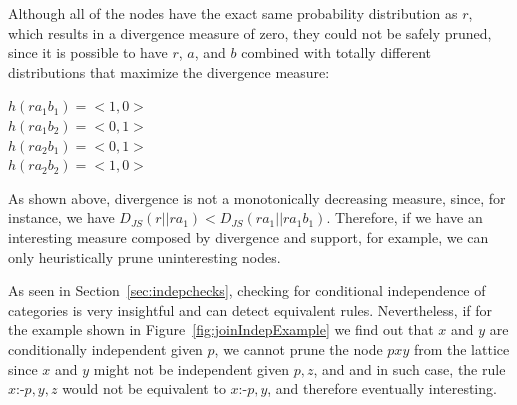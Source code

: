 Although all of the nodes have the exact same probability distribution as $r$, which results in a divergence measure of
zero, they could not be safely pruned, since it is possible to have $r$, $a$, and $b$ combined with totally different
distributions that maximize the divergence measure:

\begin{center}
$h(ra_1b_1)=<1,0>$ \\
$h(ra_1b_2)=<0,1>$ \\
$h(ra_2b_1)=<0,1>$ \\
$h(ra_2b_2)=<1,0>$
\end{center}

As shown above, divergence is not a monotonically decreasing measure, since, for instance, we have $D_{JS}(r || ra_1) <
D_{JS}(ra_1 || ra_1b_1)$. Therefore, if we have an interesting measure composed by divergence and support, for example,
we can only heuristically prune uninteresting nodes.

As seen in Section~\ref{sec:indepchecks}, checking for conditional independence of categories is very insightful
and can detect equivalent rules. Nevertheless, if for the example shown in Figure~\ref{fig:joinIndepExample} we find out
that $x$ and $y$ are conditionally independent given $p$, we cannot prune the node $pxy$ from the lattice since $x$ and
$y$ might not be independent given $p,z$, and and in such case, the rule $x$:-$p,y,z$ would not be equivalent to
$x$:-$p,y$, and therefore eventually interesting.

